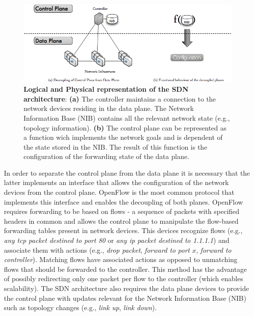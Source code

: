 \begin{figure}
  \centering 
  \footnotesize
  \includegraphics[scale=0.5]{pic/sdn-2d.png}
  \caption[Logical and Physical representation of the SDN architecture]{\textbf{Logical and Physical representation of the SDN architecture}: \textbf{(a)} The controller maintains a connection to the network devices residing in the data plane. The Network Information Base (NIB) contains all the relevant network state (e.g., topology information). \textbf{(b)} The control plane can be represented as a function wich implements the network goals and is dependent of the state stored in the NIB. The result of this function is the configuration of the forwarding state of the data plane.}
  \label{fig:sdn.2d}
\end{figure}

In order to separate the control plane from the data plane it is necessary that the latter implements an interface that allows the configuration of the network devices from the control plane. OpenFlow \cite{openflow} is the most common protocol  that implements this interface and  enables the decoupling of both planes. OpenFlow requires forwarding to be based on flows - a sequence of packets with specified headers in common and allows the control plane to manipulate the flow-based forwarding tables present in network devices. This devices recognize flows (e.g., \emph{any tcp packet destined to port 80} or \emph{any ip packet destined to 1.1.1.1}) and associate them with actions (e.g., \emph{drop packet}, \emph{forward to port $x$}, \emph{forward to controller}). Matching flows have associated actions as opposed to unmatching flows that should be forwarded to the controller. This method has the advantage of possibly redirecting only one packet per flow to the controller (which enables scalability). The SDN architecture also requires the data plane devices to provide the control plane with  updates relevant for the Network Information Base (NIB) such as topology changes  (e.g., \emph{link up}, \emph{link down}).  


